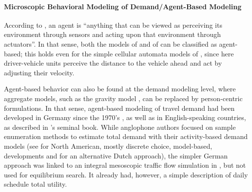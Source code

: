 \paragraph{Microscopic Behavioral Modeling of Demand/Agent-Based Modeling} 
According to \citet[][p.~53]{RusselNorvig2010ArtificialIntelligence}, an \gls{agent} is ``anything that can be viewed as perceiving its environment through sensors and acting upon that environment through actuators''. In that sense, both the models of \citet{Seddon_Simulation_1972} and of \citet{Wiedemann_PhDThesis_1974} can be classified as agent-based; this holds even for the simple cellular automata models of \citet{NagelSchreckenberg1992CA}, since here driver-vehicle units perceive the distance to the vehicle ahead and act by adjusting their velocity.  

Agent-based behavior can also be found at the demand modeling level, where aggregate models, such as the gravity model \citep{Wilson1971SpatialInteraction}, can be replaced by person-centric formulations. In that sense, agent-based modeling of travel demand had been developed in Germany since the 1970's \citep[see the references in][]{AxhausenHerz_JTE_1989}, as well as in English-speaking countries, as described in \citet[][]{JonesEtAl_1983}'s seminal book.  
%
%
While anglophone authors focused on sample enumeration methods to estimate total demand with their 
activity-based demand models (see \citet[][]{BradleyBowman_TRBTDF_2006} for North American, mostly discrete choice, model-based, developments and \citet[][]{ArentzeTimmermans_2000} for an alternative Dutch approach), the simpler German approach was linked to an integral mesoscopic traffic flow simulation in \citet[][]{Axhausen_PhDThesis_1988}, but not used for equilibrium search. It already had, however, a simple description of daily schedule total utility.


